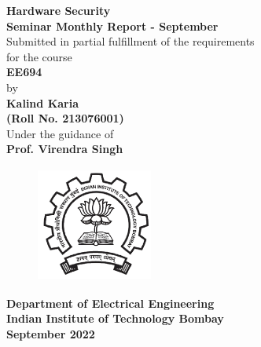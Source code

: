 \documentclass[a4paper,12pt, final]{report}
\begin{document}
    \thispagestyle{empty}
    \vspace*{1cm}
    
{
    \centering
    \textbf{\LARGE Hardware Security}\\
    \vspace{1.20cm}
    \textbf{\large Seminar Monthly Report - September}\\
    \vspace{1cm}
    {Submitted in partial fulfillment of the requirements}\\
    \vspace{0.25cm}
    {for the course}\\
    \vspace{1cm}
    \textbf{EE694}\\
    \vspace{1.50cm}
    {by}\\
    \vspace{0.20cm}
    \textbf{\large Kalind Karia}\\
    \vspace{0.25cm}
    \textbf{\large (Roll No. 213076001)}\\
    \vspace{1.8cm}
    {Under the guidance of}\\
    \vspace{0.20cm}
    \textbf{\large Prof. Virendra Singh}\\
    \vspace{0.30cm}
    \vspace{1.450cm}
    
    \begin{figure}[htb]
        \begin{center}
            \includegraphics[height=1.5in,width=1.5in]{images/iitblogo.png}
        \end{center}
    \end{figure}

    {\textbf{Department of Electrical Engineering}}\\
    {\textbf{Indian Institute of Technology Bombay}}\\[10pt]
    {\textbf{September 2022}}
 
}
 
\end{document}
